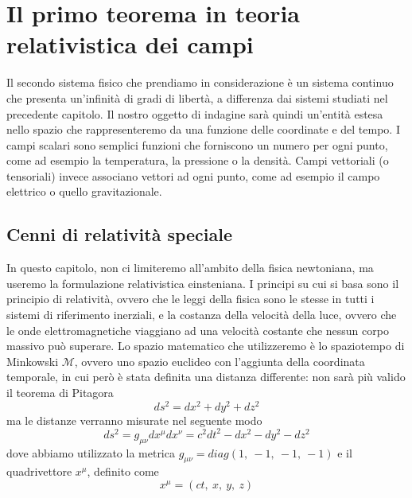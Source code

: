 \chapter{Il primo teorema in teoria relativistica dei campi}

    Il secondo sistema fisico che prendiamo in considerazione è un sistema continuo che presenta un'infinità di gradi di libertà, a differenza dai sistemi studiati nel precedente capitolo. Il nostro oggetto di indagine sarà quindi un'entità estesa nello spazio che rappresenteremo da una funzione delle coordinate e del tempo. I campi scalari sono semplici funzioni che forniscono un numero per ogni punto, come ad esempio la temperatura, la pressione o la densità. Campi vettoriali (o tensoriali) invece associano vettori ad ogni punto, come ad esempio il campo elettrico o quello gravitazionale.

\section{Cenni di relatività speciale}
    In questo capitolo, non ci limiteremo all'ambito della fisica newtoniana, ma useremo la formulazione relativistica einsteniana. I principi su cui si basa sono il principio di relatività, ovvero che le leggi della fisica sono le stesse in tutti i sistemi di riferimento inerziali, e la costanza della velocità della luce, ovvero che le onde elettromagnetiche viaggiano ad una velocità costante che nessun corpo massivo può superare. Lo spazio matematico che utilizzeremo è lo spaziotempo di Minkowski $\mathcal M$, ovvero uno spazio euclideo con l'aggiunta della coordinata temporale, in cui però è stata definita una distanza differente: non sarà più valido il teorema di Pitagora 
    \begin{equation*}
        ds^2 = dx^2 + dy^2 + dz^2
    \end{equation*}
    ma le distanze verranno misurate nel seguente modo
    \begin{equation*}
        ds^2 = g_{\mu\nu} dx^\mu dx^\nu = c^2 dt^2 - dx^2 - dy^2 - dz^2
    \end{equation*}
    dove abbiamo utilizzato la metrica $g_{\mu\nu} = diag(1,~-1,~-1,~-1)$ e il quadrivettore $x^\mu$, definito come 
    \begin{equation*}
        x^\mu = (ct,~x,~y,~z)
    \end{equation*}
    
